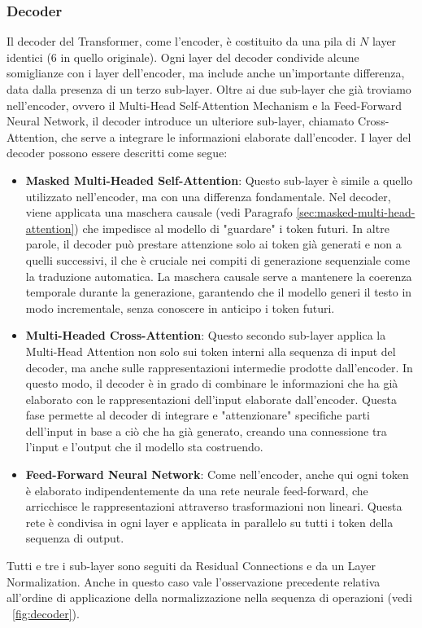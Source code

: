 \subsubsection{Decoder}
Il decoder del Transformer, come l'encoder, è costituito da una pila di \(N\) layer identici (6 in quello originale). Ogni layer del decoder condivide alcune somiglianze con i layer dell'encoder, ma include anche un'importante differenza, data dalla presenza di un terzo sub-layer. Oltre ai due sub-layer che già troviamo nell'encoder, ovvero il Multi-Head Self-Attention Mechanism e la Feed-Forward Neural Network, il decoder introduce un ulteriore sub-layer, chiamato Cross-Attention, che serve a integrare le informazioni elaborate dall'encoder.
I layer del decoder possono essere descritti come segue:
\begin{itemize}
	\item \textbf{Masked Multi-Headed Self-Attention}: Questo sub-layer è simile a quello utilizzato nell'encoder, ma con una differenza fondamentale. Nel decoder, viene applicata una maschera causale (vedi Paragrafo \ref{sec:masked-multi-head-attention}) che impedisce al modello di "guardare" i token futuri. In altre parole, il decoder può prestare attenzione solo ai token già generati e non a quelli successivi, il che è cruciale nei compiti di generazione sequenziale come la traduzione automatica. La maschera causale serve a mantenere la coerenza temporale durante la generazione, garantendo che il modello generi il testo in modo incrementale, senza conoscere in anticipo i token futuri.
	\item \textbf{Multi-Headed Cross-Attention}: Questo secondo sub-layer applica la Multi-Head Attention non solo sui token interni alla sequenza di input del decoder, ma anche sulle rappresentazioni intermedie prodotte dall'encoder. In questo modo, il decoder è in grado di combinare le informazioni che ha già elaborato con le rappresentazioni dell'input elaborate dall'encoder. Questa fase permette al decoder di integrare e "attenzionare" specifiche parti dell'input in base a ciò che ha già generato, creando una connessione tra l'input e l'output che il modello sta costruendo.
	\item \textbf{Feed-Forward Neural Network}: Come nell'encoder, anche qui ogni token è elaborato indipendentemente da una rete neurale feed-forward, che arricchisce le rappresentazioni attraverso trasformazioni non lineari. Questa rete è condivisa in ogni layer e applicata in parallelo su tutti i token della sequenza di output.
\end{itemize}
Tutti e tre i sub-layer sono seguiti da Residual Connections e da un Layer Normalization. Anche in questo caso vale l'osservazione precedente relativa all'ordine di applicazione della normalizzazione nella sequenza di operazioni \cite{xiong2020layernormalizationtransformerarchitecture} (vedi \figurename{~\ref{fig:decoder}}).

